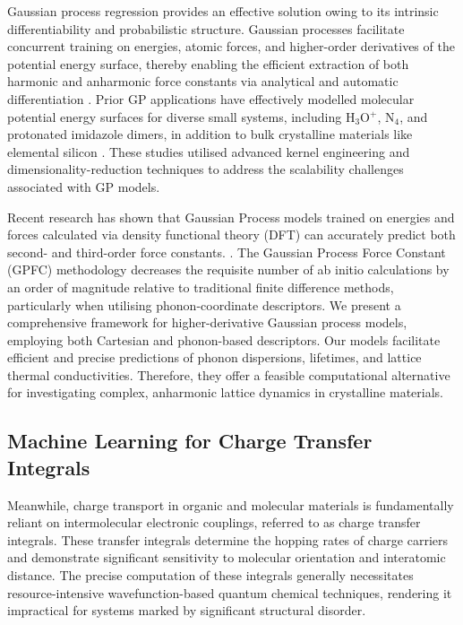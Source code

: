 Gaussian process regression provides an effective solution owing to its intrinsic differentiability and probabilistic structure.  Gaussian processes facilitate concurrent training on energies, atomic forces, and higher-order derivatives of the potential energy surface, thereby enabling the efficient extraction of both harmonic and anharmonic force constants via analytical and automatic differentiation \cite{Solak2002, Dai2020}.  Prior GP applications have effectively modelled molecular potential energy surfaces for diverse small systems, including H$_3$O$^+$, N$_4$, and protonated imidazole dimers, in addition to bulk crystalline materials like elemental silicon \cite{Handley2009, Cui2016, Sugisawa2020, Bartk2018}.  These studies utilised advanced kernel engineering and dimensionality-reduction techniques to address the scalability challenges associated with GP models.

Recent research has shown that Gaussian Process models trained on energies and forces calculated via density functional theory (DFT) can accurately predict both second- and third-order force constants. \cite{https://doi.org/10.48550/arxiv.2405.05113}.  The Gaussian Process Force Constant (GPFC) methodology decreases the requisite number of ab initio calculations by an order of magnitude relative to traditional finite difference methods, particularly when utilising phonon-coordinate descriptors.  We present a comprehensive framework for higher-derivative Gaussian process models, employing both Cartesian and phonon-based descriptors.  Our models facilitate efficient and precise predictions of phonon dispersions, lifetimes, and lattice thermal conductivities. Therefore, they offer a feasible computational alternative for investigating complex, anharmonic lattice dynamics in crystalline materials.

\subsection{Machine Learning for Charge Transfer Integrals}

Meanwhile, charge transport in organic and molecular materials is fundamentally reliant on intermolecular electronic couplings, referred to as charge transfer integrals.  These transfer integrals determine the hopping rates of charge carriers and demonstrate significant sensitivity to molecular orientation and interatomic distance.  The precise computation of these integrals generally necessitates resource-intensive wavefunction-based quantum chemical techniques, rendering it impractical for systems marked by significant structural disorder.

